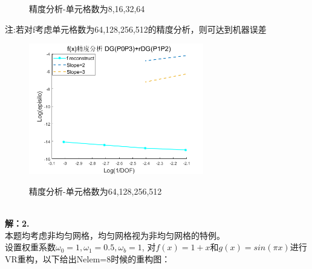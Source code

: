 \documentclass[a4paper,11pt,UTF8]{article}%
\theoremstyle{plain}
\begin{document}
	\begin{figure}[!h]
	\centering
	\hfill
	\caption{精度分析-单元格数为8,16,32,64}
\end{figure}
\clearpage
 \noindent 注:若对f考虑单元格数为64,128,256,512的精度分析，则可达到机器误差\\
	\begin{figure}[!h]
	\centering
	{
		\includegraphics[width=3in]{HLSr/f精度分析64.png} 
	}
	\caption{精度分析-单元格数为64,128,256,512}
\end{figure}\\
\noindent \textbf{解：2.}\\
\indent 本题均考虑非均匀网格，均匀网格视为非均匀网格的特例。\\
\indent 设置权重系数$\omega_0=1,\omega_1=0.5,\omega_b=1$, 对$f\left(x\right)=1+x$和$g\left(x\right)=sin\left(\pi x\right)$进行VR重构，以下给出Nelem=8时候的重构图：\\
\end{document}
